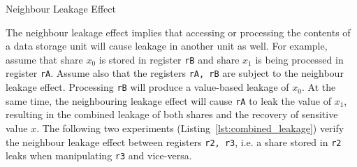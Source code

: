 \begin{subsection}{Neighbour Leakage Effect}\label{combined_leakage}

The neighbour leakage effect implies that accessing or processing the contents of a data storage unit will cause leakage in another unit as well. For example, assume that share $x_0$ is stored in register \texttt{rB} and share $x_1$ is being processed in register \texttt{rA}. Assume also that the registers \texttt{rA, rB} are subject to the neighbour leakage effect. Processing \texttt{rB} will produce a value-based leakage of $x_0$. At the same time, the neighbouring leakage effect will cause \texttt{rA} to leak the value of $x_1$, resulting in the combined leakage of both shares and the recovery of sensitive value $x$. The following two experiments (Listing~\ref{lst:combined_leakage}) verify the neighbour leakage effect between registers \texttt{r2, r3}, i.e. a share stored in \texttt{r2} leaks when manipulating \texttt{r3} and vice-versa. 




\end{subsection}
